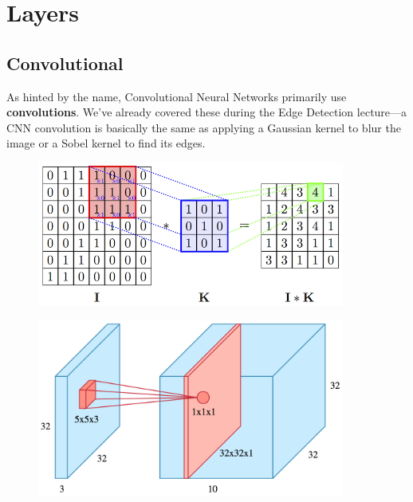 \documentclass{article}
\begin{document}
\section{Layers}

\subsection{Convolutional}
As hinted by the name, Convolutional Neural Networks primarily use \textbf{convolutions}. We've already covered these during the Edge Detection lecture—a CNN convolution is basically the same as applying a Gaussian kernel to blur the image or a Sobel kernel to find its edges.
\begin{figure}[!htb]
\centering
\begin{minipage}{0.6\textwidth}
  \centering
  \includegraphics[width=0.9\textwidth]{convolve.png}
  \label{fig:test1}
\end{minipage}%
\begin{minipage}{0.4\textwidth}
  \centering
  \includegraphics[width=0.9\textwidth]{conv_layer.png}
  \label{fig:test2}
\end{minipage}
\end{figure}
\end{document}
